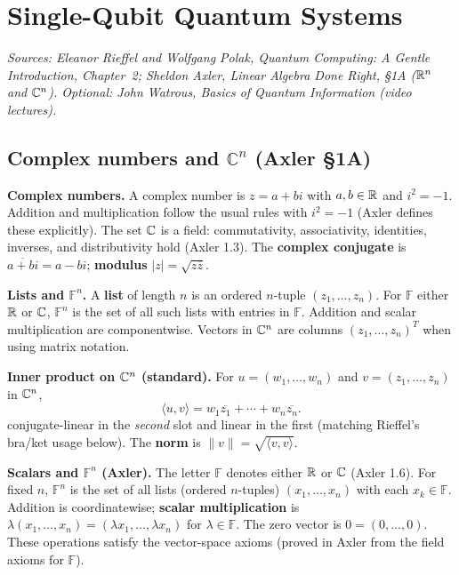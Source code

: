 \chapter{Single-Qubit Quantum Systems}

\noindent\textit{Sources: Eleanor Rieffel and Wolfgang Polak, \textit{Quantum Computing: A Gentle Introduction}, Chapter~2; Sheldon Axler, \textit{Linear Algebra Done Right}, \S1A ($\mathbb{R}^n$ and $\mathbb{C}^n$). Optional: John Watrous, \textit{Basics of Quantum Information} (video lectures).}

\section{Complex numbers and $\mathbb{C}^n$ (Axler \S1A)}

\textbf{Complex numbers.} A complex number is $z=a+bi$ with $a,b\in\mathbb{R}$ and $i^2=-1$. Addition and multiplication follow the usual rules with $i^2=-1$ (Axler defines these explicitly). The set $\mathbb{C}$ is a field: commutativity, associativity, identities, inverses, and distributivity hold (Axler 1.3). The \textbf{complex conjugate} is $\overline{a+bi}=a-bi$; \textbf{modulus} $|z|=\sqrt{z\overline{z}}$.

\textbf{Lists and $\mathbb{F}^n$.} A \textbf{list} of length $n$ is an ordered $n$-tuple $(z_1,\ldots,z_n)$. For $\mathbb{F}$ either $\mathbb{R}$ or $\mathbb{C}$, $\mathbb{F}^n$ is the set of all such lists with entries in $\mathbb{F}$. Addition and scalar multiplication are componentwise. Vectors in $\mathbb{C}^n$ are columns $(z_1,\ldots,z_n)^T$ when using matrix notation.

\textbf{Inner product on $\mathbb{C}^n$ (standard).} For $u=(w_1,\ldots,w_n)$ and $v=(z_1,\ldots,z_n)$ in $\mathbb{C}^n$,
\[
\langle u,v\rangle = w_1\overline{z_1}+\cdots+w_n\overline{z_n}.
\]
conjugate-linear in the \emph{second} slot and linear in the first (matching Rieffel's bra/ket usage below). The \textbf{norm} is $\|v\|=\sqrt{\langle v,v\rangle}$.

\textbf{Scalars and $\mathbb{F}^n$ (Axler).} The letter $\mathbb{F}$ denotes either $\mathbb{R}$ or $\mathbb{C}$ (Axler 1.6). For fixed $n$, $\mathbb{F}^n$ is the set of all lists (ordered $n$-tuples) $(x_1,\ldots,x_n)$ with each $x_k\in\mathbb{F}$. Addition is coordinatewise; \textbf{scalar multiplication} is $\lambda(x_1,\ldots,x_n)=(\lambda x_1,\ldots,\lambda x_n)$ for $\lambda\in\mathbb{F}$. The zero vector is $0=(0,\ldots,0)$. These operations satisfy the vector-space axioms (proved in Axler from the field axioms for $\mathbb{F}$).

